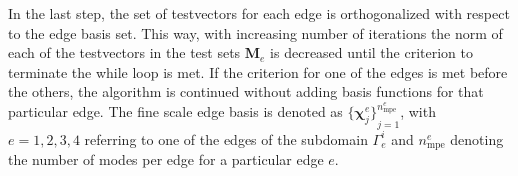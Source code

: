 \documentclass[AMA,STIX1COL,doublespace]{WileyNJD-v2}
\begin{document}
In the last step, the set of testvectors for each edge is orthogonalized
with respect to the edge basis set.
This way, with increasing number of iterations the norm of each of the
testvectors in the test sets $\bm{M}_e$ is decreased until the
criterion to terminate the while loop is met.
If the criterion for one of the edges is met before the others,
the algorithm is continued without adding basis functions for
that particular edge.
The fine scale edge basis is denoted as ${\{\bm{\chi}^e_j\}}_{j=1}^{n^e_{\mathrm{mpe}}}$, with $e=1, 2, 3, 4$ referring to one of the edges of the subdomain $\varGamma_e^i$ and $n^e_{\mathrm{mpe}}$ denoting the number of modes per edge for a particular edge $e$.
\end{document}
